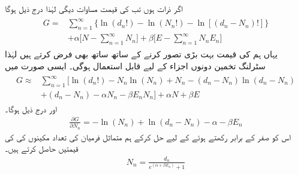 اگر ذرات  ہوں تب  کی قیمت مساوات  دیگی لہٰذا درج ذیل ہوگا 
\begin{gather}
\begin{aligned}
G =& \sum_{n = 1}^{\infty} \{ \ln(d_n !) - \ln(N_n !) - \ln[(d_n - N_n) !] \} \\
&+ \alpha \big [ N - \sum_{n = 1}^{\infty} N_n \big ] + \beta \big [ E - \sum_{n = 1}^{\infty} N_n E_n \big ]
\end{aligned}
\end{gather}
یہاں ہم  کی قیمت بہت بڑی تصور کرنے کے ساتھ ساتھ  بھی فرض کرتے ہیں لہٰذا سٹرلنگ تخمین دونوں اجزاء کے لیے قابل استعمال ہوگی۔ ایسی صورت میں 
\begin{gather}
\begin{aligned} 
G \approx & \sum_{n = 1}^{\infty} \big [ \ln(d_n !) - N_n \ln(N_n) + N_n - (d_n - N_n) \ln(d_n - N_n) \\
&+ (d_n - N_n) - \alpha N_n - \beta E_n N_n \big ] + \alpha N + \beta E
\end{aligned}
\end{gather}
اور درج ذیل ہوگا۔
\begin{align}
\frac{\partial G}{\partial N_n} = - \ln(N_n) + \ln(d_n - N_n) - \alpha - \beta E_n
\end{align}
اس کو صفر کے برابر رکھتے ہوئے  کے لیے حل کرکے ہم متماثل فرمیان کی تعداد مکینوں کی   کی قیمتیں حاصل کرتے ہیں۔
\begin{align}\label{مساوات_متماثل_سب_سے_زیادہ_محتمل_برائے_فرمیان}
N_n = \frac{d_n}{e^{(\alpha + \beta E_n)}+1}
\end{align}

